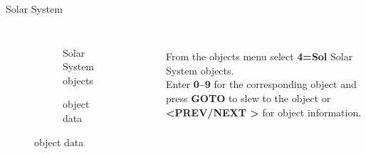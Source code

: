 
\begin{frame}[t]{Solar System}
  \begin{columns}[T]
    \begin{figure}[ht]
        \begin{subfigure}{0.67\textwidth}
        \caption{Solar System objects}
      \end{subfigure}
      \vspace{\fill}
      \begin{subfigure}{0.67\textwidth}
        \caption{object data}
      \end{subfigure}
    \end{figure}
  \ \\[0.25ex]
  From the objects menu select \textbf{4=Sol} Solar System objects.\\[1ex]

  Enter \textbf{0--9} for the corresponding object and press \textbf{GOTO} to
  slew to the object or \textbf{\textless PREV/NEXT \textgreater} for object
  information. \\[1ex]
\end{columns}
\end{frame}



